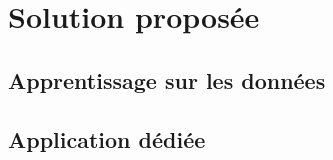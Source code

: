 \section{Solution proposée}
\subsection{Apprentissage sur les données}
\paragraph{}
\subsection{Application dédiée}
\paragraph{}

